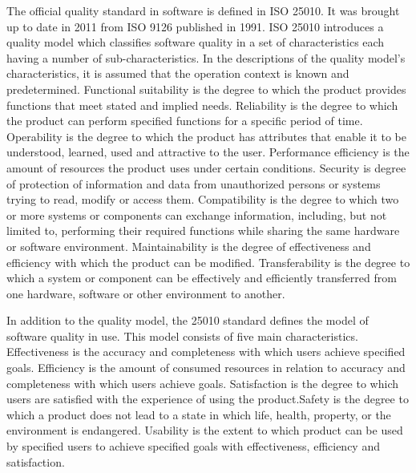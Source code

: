 
 
The official quality standard in software is defined in ISO 25010. It was brought up to date in 2011 from ISO 9126 published in 1991. ISO 25010 introduces a quality model which classifies software quality in a set of characteristics each having a number of sub-characteristics. In the descriptions of the quality model's characteristics, it is assumed that the operation context is known and predetermined. Functional suitability is the degree to which the product provides functions that meet stated and implied needs. Reliability is the degree to which the product can perform specified functions for a specific period of time. Operability is the degree to which the product has attributes that enable it to be understood, learned, used and attractive to the user. Performance efficiency is the amount of resources the product uses under certain conditions. Security is degree of protection of information and data from unauthorized persons or systems trying to read, modify or access them. Compatibility is the degree to which two or more systems or components can exchange information, including, but not limited to, performing their required functions while sharing the same hardware or software environment. Maintainability is the degree of effectiveness and efficiency with which the product can be modified.  Transferability is the degree to which a system or component can be effectively and efficiently transferred from one hardware, software or other environment to another.~\cite{ISOBlog}

In addition to the quality model, the 25010 standard defines the model of software quality in use. This model consists of five main characteristics. Effectiveness is the accuracy and completeness with which users achieve specified goals. Efficiency is the amount of consumed resources in relation to accuracy and completeness with which users achieve goals. Satisfaction is the degree to which users are satisfied with the experience of using the product.Safety is the degree to which a product does not lead to a state in which life, health, property, or the environment is endangered. Usability is the extent to which product can be used by specified users to achieve specified goals with effectiveness, efficiency and satisfaction.~\cite{ISOBlog}





 
 
 